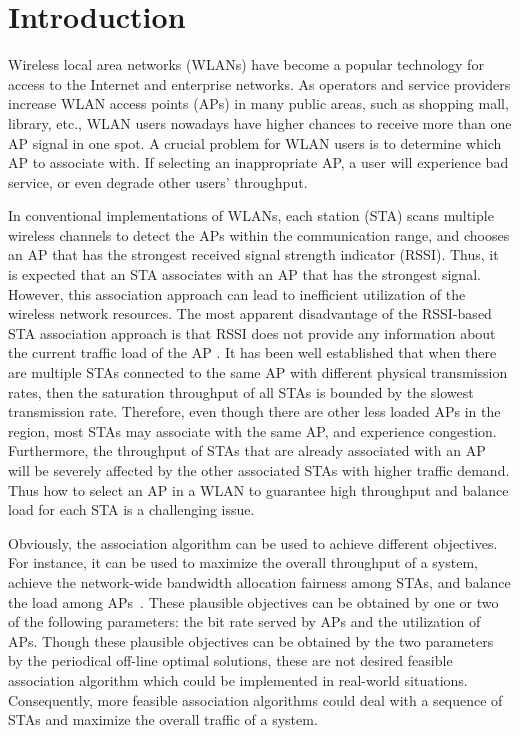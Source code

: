 \documentclass[conference]{IEEEtran}
\begin{document}
\section{Introduction}
 Wireless local area networks (WLANs) have become a popular technology for access to the Internet and enterprise networks. As operators and service providers increase WLAN access points (APs) in many public areas, such as shopping mall, library, etc., WLAN users nowadays have higher chances to receive more than one AP signal in one spot. A crucial problem for WLAN users is to determine which AP to associate with. If selecting an inappropriate AP, a user will experience bad service, or even degrade other users' throughput.

  In conventional implementations of WLANs, each station (STA) scans multiple wireless channels to detect the APs within the communication range, and chooses an AP that has the strongest received signal strength indicator (RSSI). Thus, it is expected that an STA associates with an AP that has the strongest signal. However, this association approach can lead to inefficient utilization of the wireless network resources. The most apparent disadvantage of the RSSI-based STA association approach is that RSSI does not provide any information about the current traffic load of the AP \cite{he2010design}. It has been well established that when there are multiple STAs connected to the same AP with different physical transmission rates, then the saturation throughput of all STAs is bounded by the slowest transmission rate. Therefore, even though there are other less loaded APs in the region, most STAs may associate with the same AP, and experience congestion. Furthermore, the throughput of STAs that are already associated with an AP will be severely affected by the other associated STAs with higher traffic demand. Thus how to select an AP in a WLAN to guarantee high throughput and balance load for each STA is a challenging issue\cite{kim2010alpha}.

  Obviously, the association algorithm can be used to achieve different objectives.  For instance, it can be used to maximize the overall throughput of a system, achieve the network-wide bandwidth allocation fairness among STAs, and balance the load among APs~\cite{Bejerano:2004}.  These plausible objectives can be obtained by one or two of the following parameters: the bit rate served by APs and the utilization of APs.  Though these plausible objectives can be obtained by the two parameters by the periodical off-line optimal solutions, these are not desired feasible association algorithm which could be implemented in real-world situations.  Consequently, more feasible association algorithms could deal with a sequence of STAs and maximize the overall traffic of a system.
\end{document}
